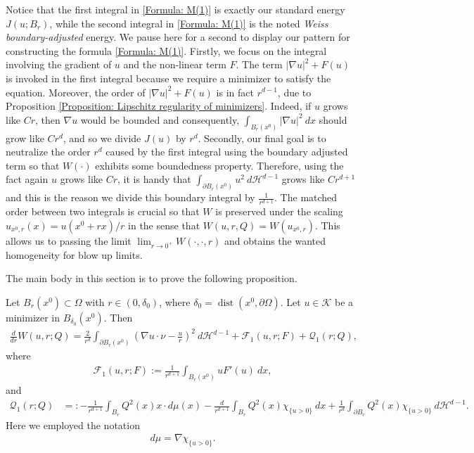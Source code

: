 \documentclass[11pt,reqno]{amsart}
\begin{document}
\begin{remark}
	Notice that the first integral in \eqref{Formula: M(1)} is exactly our standard energy $J(u;B_{r})$, while the second integral in \eqref{Formula: M(1)} is the noted \emph{Weiss boundary-adjusted} energy. We pause here for a second to display our pattern for constructing the formula \eqref{Formula: M(1)}. Firstly, we focus on the integral involving the gradient of $u$ and the non-linear term $F$. The term $|\nabla u|^{2}+F(u)$ is invoked in the first integral because we require a minimizer to satisfy the equation. Moreover, the order of $|\nabla u|^{2}+F(u)$ is in fact $r^{d-1}$, due to Proposition \ref{Proposition: Lipschitz regularity of minimizers}. Indeed, if $u$ grows like $Cr$, then $\nabla u$ would be bounded and consequently, $\int_{B_{r}(x^{0})}|\nabla u|^{2}\:dx$ should grow like $Cr^{d}$, and so we divide $J(u)$ by $r^{d}$. Secondly, our final goal is to neutralize the order $r^{d}$ caused by the first integral using the boundary adjusted term so that $W(\cdot)$ exhibits some boundedness property. Therefore, using the fact again $u$ grows like $Cr$, it is handy that $\int_{\partial B_{r}(x^{0})}u^{2}\:d\mathcal{H}^{d-1}$ grows like $Cr^{d+1}$ and this is the reason we divide this boundary integral by $\tfrac{1}{r^{d+1}}$. The matched order between two integrals is crucial so that $W$ is preserved under the scaling $u_{x^{0},r}(x)=u(x^{0}+rx)/r$ in the sense that $W(u,r,Q)=W(u_{x^{0},r})$. This allows us to passing the limit $\lim_{r\to0^{+}}W(\cdot,\cdot,r)$ and obtains the wanted homogeneity for blow up limits.
\end{remark}
The main body in this section is to prove the following proposition.
\begin{proposition}\label{Proposition: Weiss-type monotonicity formula}
	Let $B_{r}(x^{0})\subset\Omega$ with $r\in(0,\delta_{0})$, where $\delta_{0}=\operatorname{dist}(x^{0},\partial\Omega)$. Let $u\in\mathcal{K}$ be a minimizer in $B_{\delta_{0}}(x^{0})$. Then
	\begin{align}\label{Formula: M(2)}
		\frac{d}{dr}W(u,r;Q)=\frac{2}{r^{d}}\int_{\partial B_{r}(x^{0})}\left(\nabla u\cdot\nu-\frac{u}{r}\right)^{2}\:d\mathcal{H}^{d-1}+\mathcal{F}_{1}(u,r;F)+\mathcal{Q}_{1}(r;Q),
	\end{align}
	where
	\begin{align}\label{Formula: M(3)}
		\mathcal{F}_{1}(u,r;F):=\frac{1}{r^{d+1}}\int_{B_{r}(x^{0})}uF'(u)\:dx,
	\end{align}
	and
	\begin{align}\label{Formula: M(4)}
		\mathcal{Q}_{1}(r;Q)&=:-\frac{1}{r^{d+1}}\int_{B_{r}}Q^{2}(x)x\cdot d\mu(x)-\frac{d}{r^{d+1}}\int_{B_{r}}Q^{2}(x)\chi_{\{u>0\}}\:dx+\frac{1}{r^{d}}\int_{\partial B_{r}}Q^{2}(x)\chi_{\{u>0\}}\:d\mathcal{H}^{d-1}.
	\end{align}
	Here we employed the notation
	\begin{align}\label{Formula: M(4')}
		d\mu=\nabla\chi_{\{u>0\}}.
	\end{align}
\end{proposition}
\end{document}
